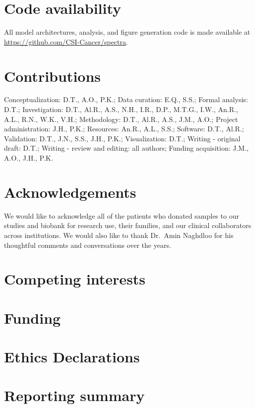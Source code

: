 \documentclass[11pt]{article}
\begin{document}
\section*{Code availability}
All model architectures, analysis, and figure generation code is made available at \url{https://github.com/CSI-Cancer/spectra}.

\section*{Contributions}
Conceptualization: D.T., A.O., P.K.; Data curation: E.Q., S.S.; Formal analysis: D.T.; Investigation: D.T., Al.R., A.S., N.H., I.R., D.P., M.T.G., I.W., An.R., A.L., R.N., W.K., V.H.; Methodology: D.T., Al.R., A.S., J.M., A.O.; Project administration: J.H., P.K.; Resources: An.R., A.L., S.S.; Software: D.T., Al.R.; Validation: D.T., J.N., S.S., J.H., P.K.; Visualization: D.T.; Writing - original draft: D.T.; Writing - review and editing: all authors; Funding acquisition: J.M., A.O., J.H., P.K.

\section*{Acknowledgements}
We would like to acknowledge all of the patients who donated samples to our studies and biobank for research use, their families, and our clinical collaborators across institutions. We would also like to thank Dr.\ Amin Naghdloo for his thoughtful comments and conversations over the years.

\section*{Competing interests}

\section*{Funding}

\section*{Ethics Declarations}

\section*{Reporting summary}
\end{document}
